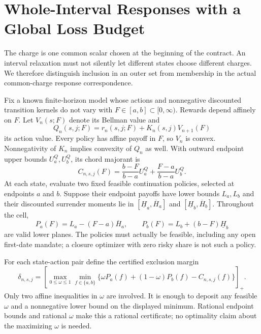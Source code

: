 \section{Whole-Interval Responses with a Global Loss Budget}
\label{sec:r19-interval}
The charge is one common scalar chosen at the beginning of the contract. An interval relaxation must not silently let different states choose different charges. We therefore distinguish inclusion in an outer set from membership in the actual common-charge response correspondence.

Fix a known finite-horizon model whose actions and nonnegative discounted transition kernels do not vary with $F\in[a,b]\subset[0,\infty)$. Rewards depend affinely on $F$. Let $V_n(s;F)$ denote its Bellman value and
\begin{equation}
 Q_n(s,j;F)=r_n(s,j;F)+K_n(s,j)V_{n+1}(F)
 \label{eq:r19-action-value}
\end{equation}
its action value. Every policy has affine payoff in $F$, so $V_n$ is convex. Nonnegativity of $K_n$ implies convexity of $Q_n$ as well. With outward endpoint upper bounds $U^Q_a,U^Q_b$, its chord majorant is
\[
 C_{n,s,j}(F)=\frac{b-F}{b-a}U^Q_a+\frac{F-a}{b-a}U^Q_b.
\]
At each state, evaluate two fixed feasible continuation policies, selected at endpoints $a$ and $b$. Suppose their endpoint payoffs have lower bounds $L_a,L_b$ and their discounted surrender moments lie in $[\underline H_a,\overline H_a]$ and $[\underline H_b,\overline H_b]$. Throughout the cell,
\begin{equation}
 P_a(F)=L_a-(F-a)\overline H_a,
 \qquad P_b(F)=L_b+(b-F)\underline H_b
 \label{eq:r19-policy-planes}
\end{equation}
are valid lower planes. The policies must actually be feasible, including any open first-date mandate; a closure optimizer with zero risky share is not such a policy.

For each state-action pair define the certified exclusion margin
\begin{equation}
 \delta_{n,s,j}=\left[\max_{0\leq\omega\leq1}
 \min_{f\in\{a,b\}}
 \{\omega P_a(f)+(1-\omega)P_b(f)-C_{n,s,j}(f)\}\right]_+.
 \label{eq:r19-cell-loss}
\end{equation}
Only two affine inequalities in $\omega$ are involved. It is enough to deposit any feasible $\omega$ and a nonnegative lower bound on the displayed minimum. Rational endpoint bounds and rational $\omega$ make this a rational certificate; no optimality claim about the maximizing $\omega$ is needed.

